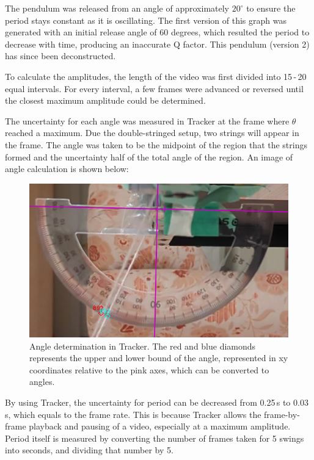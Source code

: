 \documentclass[12pt]{article}
\begin{document}
{\color{blue}
The pendulum was released from an angle of approximately $20^\circ$ to ensure the period stays constant as it is oscillating. The first version of this graph was generated with an initial release angle of 60 degrees, which resulted the period to decrease with time, producing an inaccurate Q factor. This pendulum (version 2) has since been deconstructed.

To calculate the amplitudes, the length of the video was first divided into 15\,-\,20 equal intervals. For every interval, a few frames were advanced or reversed until the closest maximum amplitude could be determined.

\newpage

The uncertainty for each angle was measured in Tracker \cite{tracker} at the frame where $\theta$ reached a maximum. Due the double-stringed setup, two strings will appear in the frame. The angle was taken to be the midpoint of the region that the strings formed and the uncertainty half of the total angle of the region. An image of angle calculation is shown below:

\begin{figure}[!hptb]
    \centering
    \includegraphics[width=\textwidth]{../figures/tracker.png}
    \caption{\centering Angle determination in Tracker. The red and blue diamonds represents the upper and lower bound of the angle, represented in xy coordinates relative to the pink axes, which can be converted to angles.}
    \label{fig:figure5}
\end{figure}

By using Tracker, the uncertainty for period can be decreased from 0.25\,s to 0.03\,s, which equals to the frame rate. This is because Tracker allows the frame-by-frame playback and pausing of a video, especially at a maximum amplitude. Period itself is measured by converting the number of frames taken for 5 swings into seconds, and dividing that number by 5.

}
\end{document}
